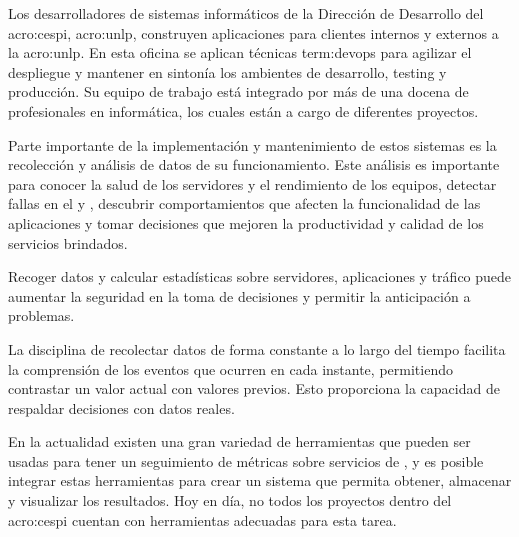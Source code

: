 Los desarrolladores de sistemas informáticos de la Dirección de Desarrollo del
\gls{acro:cespi}, \gls{acro:unlp}, construyen aplicaciones para clientes
internos y externos a la \gls{acro:unlp}. En esta oficina se aplican técnicas
\gls{term:devops} para agilizar el despliegue y mantener en sintonía los
ambientes de desarrollo, testing y producción. Su equipo de trabajo está
integrado por más de una docena de profesionales en informática, los cuales
están a cargo de diferentes proyectos.

Parte importante de la implementación y mantenimiento de estos sistemas es la
recolección y análisis de datos de su funcionamiento. Este análisis es
importante para conocer la salud de los servidores y el rendimiento de los
equipos, detectar fallas en el  y , descubrir
comportamientos que afecten la funcionalidad de las aplicaciones y tomar
decisiones que mejoren la productividad y calidad de los servicios brindados.

Recoger datos y calcular estadísticas sobre servidores, aplicaciones y tráfico
puede aumentar la seguridad en la toma de decisiones y permitir la anticipación
a problemas.

La disciplina de recolectar datos de forma constante a lo largo del tiempo
facilita la comprensión de los eventos que ocurren en cada instante,
permitiendo contrastar un valor actual con valores previos. Esto proporciona la
capacidad de respaldar decisiones con datos reales.

En la actualidad existen una gran variedad de herramientas que pueden ser
usadas para tener un seguimiento de métricas sobre servicios de ,
y es posible integrar estas herramientas para crear un sistema que permita
obtener, almacenar y visualizar los resultados. Hoy en día, no todos los
proyectos dentro del \gls{acro:cespi} cuentan con herramientas adecuadas para
esta tarea.
